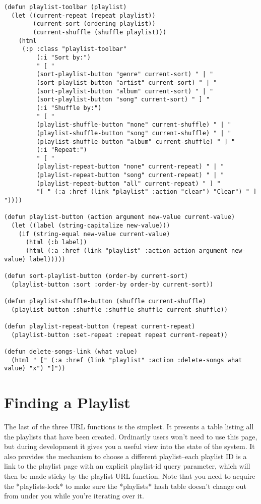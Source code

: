 \begin{lstlisting}
(defun playlist-toolbar (playlist)
  (let ((current-repeat (repeat playlist))
        (current-sort (ordering playlist))
        (current-shuffle (shuffle playlist)))
    (html
     (:p :class "playlist-toolbar"
         (:i "Sort by:")
         " [ "
         (sort-playlist-button "genre" current-sort) " | " 
         (sort-playlist-button "artist" current-sort) " | " 
         (sort-playlist-button "album" current-sort) " | " 
         (sort-playlist-button "song" current-sort) " ] "
         (:i "Shuffle by:")
         " [ "
         (playlist-shuffle-button "none" current-shuffle) " | "
         (playlist-shuffle-button "song" current-shuffle) " | "
         (playlist-shuffle-button "album" current-shuffle) " ] "
         (:i "Repeat:")
         " [ "
         (playlist-repeat-button "none" current-repeat) " | "
         (playlist-repeat-button "song" current-repeat) " | "
         (playlist-repeat-button "all" current-repeat) " ] "
         "[ " (:a :href (link "playlist" :action "clear") "Clear") " ] "))))

(defun playlist-button (action argument new-value current-value)
  (let ((label (string-capitalize new-value)))
    (if (string-equal new-value current-value)
      (html (:b label))
      (html (:a :href (link "playlist" :action action argument new-value) label)))))

(defun sort-playlist-button (order-by current-sort)
  (playlist-button :sort :order-by order-by current-sort))

(defun playlist-shuffle-button (shuffle current-shuffle)
  (playlist-button :shuffle :shuffle shuffle current-shuffle))

(defun playlist-repeat-button (repeat current-repeat)
  (playlist-button :set-repeat :repeat repeat current-repeat))

(defun delete-songs-link (what value)
  (html " [" (:a :href (link "playlist" :action :delete-songs what value) "x") "]"))
\end{lstlisting}

\section{Finding a Playlist}

The last of the three URL functions is the simplest. It presents a table listing all the
playlists that have been created. Ordinarily users won't need to use this page, but during
development it gives you a useful view into the state of the system. It also provides the
mechanism to choose a different playlist--each playlist ID is a link to the playlist page
with an explicit playlist-id query parameter, which will then be made sticky by the
playlist URL function. Note that you need to acquire the *playlists-lock* to make sure the
*playlists* hash table doesn't change out from under you while you're iterating over it.

